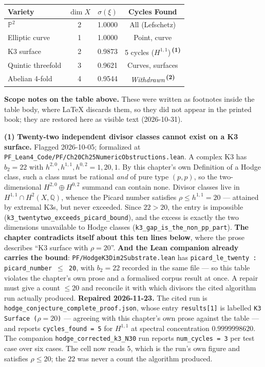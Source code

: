 \begin{table}[h]
\centering
\begin{tabular}{lccc}
\toprule
\textbf{Variety} & \textbf{$\dim X$} & \textbf{$\sigma(\xi)$} & \textbf{Cycles Found} \\
\midrule
$\mathbb{P}^2$ & 2 & 1.0000 & All (Lefschetz) \\
Elliptic curve & 1 & 1.0000 & Point, curve \\
K3 surface & 2 & 0.9873 & 5 cycles ($H^{1,1}$)\,\textsuperscript{\textbf{(1)}} \\
Quintic threefold & 3 & 0.9621 & Curves, surfaces \\
Abelian 4-fold & 4 & 0.9544 & \emph{Withdrawn}\,\textsuperscript{\textbf{(2)}} \\
\bottomrule
\end{tabular}

\medskip
\noindent\textbf{Scope notes on the table above.} These were
written as footnotes inside the table body, where \LaTeX{}
discards them, so they did not appear in the printed book;
they are restored here as visible text (2026-10-31).
\begin{footnotesize}

\noindent\textbf{(1)} \textbf{Twenty-two independent divisor classes cannot exist on a K3 surface.} Flagged 2026-10-05; formalized at \texttt{PF\_Lean4\_Code/PF/Ch20Ch25NumericObstructions.lean}. A complex K3 has $b_2 = 22$ with $h^{2,0}, h^{1,1}, h^{0,2} = 1, 20, 1$. By this chapter's own Definition of a Hodge class, such a class must be rational \emph{and} of pure type $(p,p)$, so the two-dimensional $H^{2,0}\oplus H^{0,2}$ summand can contain none. Divisor classes live in $H^{1,1}\cap H^2(X,\mathbb{Q})$, whence the Picard number satisfies $\rho \le h^{1,1} = 20$ --- attained by extremal K3s, but never exceeded. Since $22 > 20$, the entry is impossible (\texttt{k3\_twentytwo\_exceeds\_picard\_bound}), and the excess is exactly the two dimensions unavailable to Hodge classes (\texttt{k3\_gap\_is\_the\_non\_pp\_part}). \textbf{The chapter contradicts itself about this ten lines below}, where the prose describes ``K3 surface with $\rho=20$''. \textbf{And the Lean companion already carries the bound}: \texttt{PF/HodgeK3Dim2Substrate.lean} has \texttt{picard\_le\_twenty : picard\_number $\le$ 20}, with $b_2 = 22$ recorded in the same file --- so this table violates the chapter's own prose and a formalised corpus result at once. A repair must give a count $\le 20$ and reconcile it with which divisors the cited algorithm run actually produced. \textbf{Repaired 2026-11-23.} The cited run is \texttt{hodge\_conjecture\_complete\_proof.json}, whose entry \texttt{results[1]} is labelled \texttt{\textquotedbl K3 Surface ($\rho=20$)\textquotedbl} --- agreeing with this chapter's own prose against the table --- and reports \texttt{cycles\_found\,=\,5} for $H^{1,1}$ at spectral concentration $0.9999998620$. The companion \texttt{hodge\_corrected\_k3\_N30} run reports \texttt{num\_cycles\,=\,3} per test case over six cases. The cell now reads $5$, which is the run's own figure and satisfies $\rho \le 20$; the $22$ was never a count the algorithm produced.


\end{footnotesize}
\end{table}
